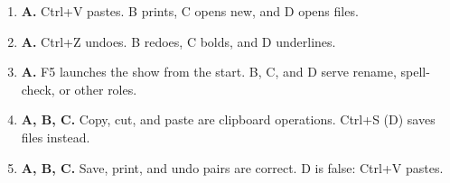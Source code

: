 \documentclass[11pt]{article}
\begin{document}
\begin{enumerate}[label=\textbf{Q\arabic*.}, leftmargin=*]
\item \textbf{A.} Ctrl+V pastes. B prints, C opens new, and D opens files.
\item \textbf{A.} Ctrl+Z undoes. B redoes, C bolds, and D underlines.
\item \textbf{A.} F5 launches the show from the start. B, C, and D serve rename, spell-check, or other roles.
\item \textbf{A, B, C.} Copy, cut, and paste are clipboard operations. Ctrl+S (D) saves files instead.
\item \textbf{A, B, C.} Save, print, and undo pairs are correct. D is false: Ctrl+V pastes.
\end{enumerate}
\def\JKSSBLessonID{21}\def\JKSSBAnswers{1}
\end{document}
